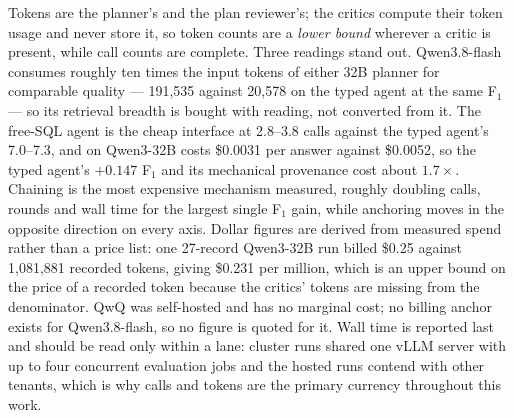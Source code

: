 \begin{table}[htbp]
{Tokens are the planner's and the plan reviewer's; the critics compute their token
usage and never store it, so token counts are a \emph{lower bound} wherever a
critic is present, while call counts are complete. Three readings stand out.
Qwen3.8-flash consumes roughly ten times the input tokens of either 32B planner
for comparable quality --- 191{,}535 against 20{,}578 on the typed agent at the
same F$_1$ --- so its retrieval breadth is bought with reading, not converted
from it. The free-SQL agent is the cheap interface at 2.8--3.8 calls against the
typed agent's 7.0--7.3, and on Qwen3-32B costs \$0.0031 per answer against
\$0.0052, so the typed agent's $+0.147$ F$_1$ and its mechanical provenance cost
about $1.7\times$. Chaining is the most expensive mechanism measured, roughly
doubling calls, rounds and wall time for the largest single F$_1$ gain, while
anchoring moves in the opposite direction on every axis. Dollar figures are
derived from measured spend rather than a price list: one 27-record Qwen3-32B run
billed \$0.25 against 1{,}081{,}881 recorded tokens, giving \$0.231 per million,
which is an upper bound on the price of a recorded token because the critics'
tokens are missing from the denominator. QwQ was self-hosted and has no marginal
cost; no billing anchor exists for Qwen3.8-flash, so no figure is quoted for it.
Wall time is reported last and should be read only within a lane: cluster runs
shared one vLLM server with up to four concurrent evaluation jobs and the hosted
runs contend with other tenants, which is why calls and tokens are the primary
currency throughout this work.}
\label{tab:efficiency}
\end{table}
